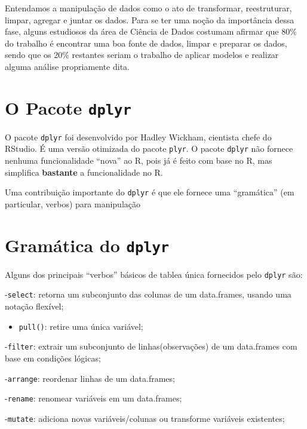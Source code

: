 \documentclass[]{book}
\providecommand{\tightlist}{%
  \setlength{\itemsep}{0pt}\setlength{\parskip}{0pt}}
\begin{document}
Entendamos a manipulação de dados como o ato de transformar, reestruturar, limpar, agregar e juntar os dados. Para se ter uma noção da importância dessa fase, alguns estudiosos da área de Ciência de Dados costumam afirmar que 80\% do trabalho é encontrar uma boa fonte de dados, limpar e preparar os dados, sendo que os 20\% restantes seriam o trabalho de aplicar modelos e realizar alguma análise propriamente dita.

\hypertarget{o-pacote-dplyr}{%
\section{\texorpdfstring{O Pacote \texttt{dplyr}}{O Pacote dplyr}}\label{o-pacote-dplyr}}

O pacote \texttt{dplyr} foi desenvolvido por Hadley Wickham, cientista chefe do RStudio. É uma versão otimizada do pacote \texttt{plyr}. O pacote \texttt{dplyr} não fornece nenhuma funcionalidade ``nova'' ao R, pois já é feito com base no R, mas simplifica \textbf{bastante} a funcionalidade no R.

Uma contribuição importante do \texttt{dplyr} é que ele fornece uma ``gramática'' (em particular, verbos) para manipulação

\hypertarget{gramuxe1tica-do-dplyr}{%
\section{\texorpdfstring{Gramática do \texttt{dplyr}}{Gramática do dplyr}}\label{gramuxe1tica-do-dplyr}}

Alguns dos principais ``verbos'' básicos de tablea única fornecidos pelo \texttt{dplyr} são:

-\texttt{select}: retorna um subconjunto das colunas de um data.frames, usando uma notação flexível;

\begin{itemize}
\tightlist
\item
  \texttt{pull()}: retire uma única variável;
\end{itemize}

-\texttt{filter}: extrair um subconjunto de linhas(observações) de um data.frames com base em condições lógicas;

-\texttt{arrange}: reordenar linhas de um data.frames;

-\texttt{rename}: renomear variáveis em um data.frames;

-\texttt{mutate}: adiciona novas variáveis/colunas ou transforme variáveis existentes;
\end{document}
